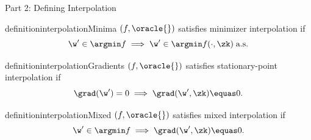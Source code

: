 \documentclass[mathserif,notheorems, hyperref={colorlinks, citecolor=blue, urlcolor=blue, linkcolor=blue}]{beamer}
\begin{document}
    \begin{frame}{Part 2: Defining Interpolation}
        \begin{minipage}{0.72\textwidth}
        \vspace{-5.25ex}
            \begin{restatable}{definition}{interpolationMinima}\label{def:interpolation-minima}
                \( (f, \oracle{}) \) satisfies minimizer interpolation if 
                \[ \w' \in \argmin f \implies \w' \in \argmin f(\cdot, \zk) \; \text{a.s.}  \]
            \end{restatable}%
            \vspace{-1ex}
            \begin{restatable}{definition}{interpolationGradients}\label{def:interpolation-gradients}
                \( (f, \oracle{}) \) satisfies stationary-point interpolation if 
                \[ \grad(\w') = 0 \implies \grad(\w', \zk) \equas 0. \]
            \end{restatable}%
            \vspace{-1ex}
            \begin{restatable}{definition}{interpolationMixed}\label{def:interpolation-mixed}
                \( (f, \oracle{}) \) satisfies mixed interpolation if 
                \[ \w' \in \argmin f \implies \grad(\w', \zk) \equas 0. \]
            \end{restatable}
        \end{minipage} 
        \begin{minipage}{0.25\textwidth}
            \centering
             

            

            
        \end{minipage}
    \end{frame}
\end{document}
